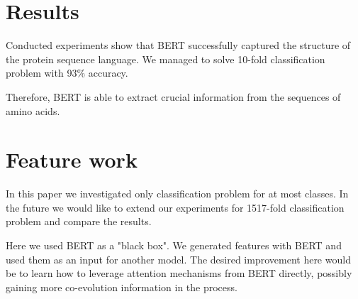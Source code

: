 \documentclass[12pt, twoside]{article}
\begin{document}
\section{Results}
\noindent

Conducted experiments show that BERT successfully captured the structure of the protein sequence language. We managed to solve 10-fold classification problem with 93\% accuracy.

Therefore, BERT is able to extract crucial information from the sequences of amino acids.

\section{Feature work}
In this paper we investigated only classification problem for at most classes. In the future we would like to extend our experiments for 1517-fold classification problem and compare the results.

Here we used BERT as a "black box". We generated features with BERT and used them as an input for another model. The desired improvement here would be to learn how to leverage attention mechanisms from BERT directly, possibly gaining more co-evolution information in the process.













\end{document}
